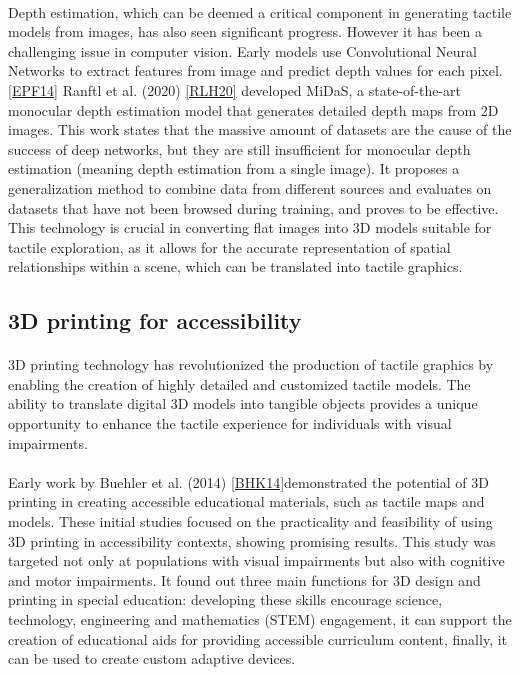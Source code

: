 \documentclass[12pt, letterpaper]{article}
\begin{document}
\begin{spacing}{1.15}
\paragraph{}
Depth estimation, which can be deemed a critical component in generating tactile models from images, has also seen significant progress. However it has been a challenging issue in
computer vision. Early models use Convolutional Neural Networks to extract features from image and predict depth values for each pixel.\hyperlink{EPF14target}{[EPF14]} Ranftl et al. (2020) \hyperlink{RLH20target}{[RLH20]}
developed MiDaS, a state-of-the-art monocular depth estimation model that generates detailed depth maps from 2D images. This work states that the massive amount of datasets are the 
cause of the success of deep networks, but they are still insufficient for monocular depth estimation (meaning depth estimation from a single image). It proposes a generalization
method to combine data from different sources and evaluates on datasets that have not been browsed during training, and proves to be effective.
This technology is crucial in converting flat images into 3D models suitable for tactile exploration, as it allows for the accurate representation of spatial relationships within a scene, which
can be translated into tactile graphics.

\subsection{3D printing for accessibility}
\paragraph{}
3D printing technology has revolutionized the production of tactile graphics by enabling the creation of highly detailed and customized tactile models. The ability to translate
digital 3D models into tangible objects provides a unique opportunity to enhance the tactile experience for individuals with visual impairments.

\paragraph{}
Early work by Buehler et al. (2014) \hyperlink{BKH14target}{[BHK14]}demonstrated the potential of 3D printing in creating accessible educational materials, such as tactile maps and models. These initial studies
focused on the practicality and feasibility of using 3D printing in accessibility contexts, showing promising results. This study was targeted not only at populations with visual
impairments but also with cognitive and motor impairments. It found out three main functions for 3D design and printing in special education: 
developing these skills encourage science, technology, engineering and mathematics (STEM) engagement,
it can support the creation of educational aids for providing accessible curriculum content,
finally, it can be used to create custom adaptive devices.

\end{spacing}
\end{document}
